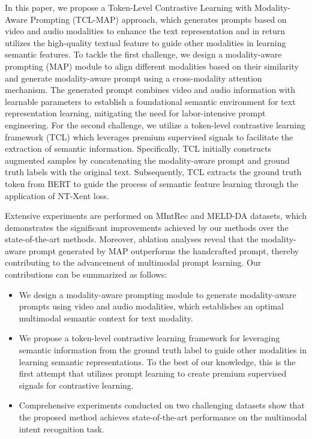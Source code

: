 \documentclass[letterpaper]{article} %
\begin{document}
In this paper, we propose a Token-Level Contrastive Learning with Modality-Aware Prompting (TCL-MAP) approach, which generates prompts based on video and audio modalities to enhance the text representation and in return utilizes the high-quality textual feature to guide other modalities in learning semantic features. To tackle the first challenge, we design a modality-aware prompting (MAP) module to align different modalities based on their similarity and generate modality-aware prompt using a cross-modality attention mechanism. The generated prompt combines video and audio information with learnable parameters to establish a foundational semantic environment for text representation learning, mitigating the need for labor-intensive prompt engineering. For the second challenge, we utilize a token-level contrastive learning framework (TCL) which leverages premium supervised signals to facilitate the extraction of semantic information. Specifically, TCL initially constructs augmented samples by concatenating the modality-aware prompt and ground truth labels with the original text. Subsequently, TCL extracts the ground truth token from BERT \cite{devlin2018bert} to guide the process of semantic feature learning through the application of NT-Xent \cite{sohn2016improved} loss.


Extensive experiments are performed on MIntRec \cite{10.1145/3503161.3547906} and MELD-DA \cite{saha-etal-2020-towards} datasets, which demonstrates the significant improvements achieved by our methods over the state-of-the-art methods. Moreover, ablation analyses reveal that the modality-aware prompt generated by MAP outperforms the handcrafted prompt, thereby contributing to the advancement of multimodal prompt learning. Our contributions can be summarized as follows:

\begin{itemize}
\item We design a modality-aware prompting module to generate modality-aware prompts using video and audio modalities, which establishes an optimal multimodal semantic context for text modality.

\item We propose a token-level contrastive learning framework for leveraging semantic information from the ground truth label to guide other modalities in learning semantic representations. To the best of our knowledge, this is the first attempt that utilizes prompt learning to create premium supervised signals for contrastive learning.

\item Comprehensive experiments conducted on two challenging datasets show that the proposed method achieves state-of-the-art performance on the multimodal intent recognition task.
\end{itemize}
\end{document}
